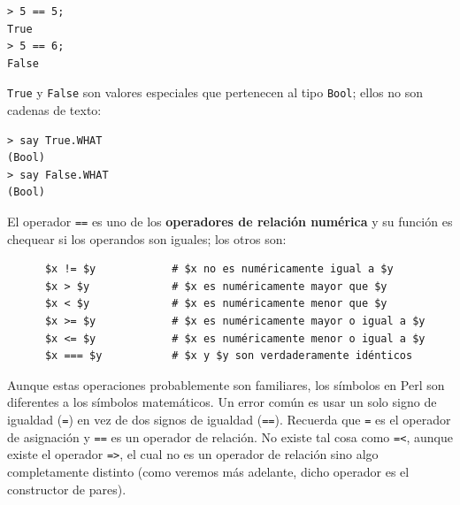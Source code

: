 \begin{verbatim}
> 5 == 5;
True
> 5 == 6;
False
\end{verbatim}
%
{\tt True} y {\tt False} son valores especiales
que pertenecen al tipo {\tt Bool}; ellos no son
cadenas de texto:

\begin{verbatim}
> say True.WHAT
(Bool)
> say False.WHAT
(Bool)
\end{verbatim}
%
El operador {\tt ==} es uno de los {\bf operadores de relación
numérica} y su función es chequear si los operandos son 
iguales; los otros son:

\begin{verbatim}
      $x != $y            # $x no es numéricamente igual a $y
      $x > $y             # $x es numéricamente mayor que $y
      $x < $y             # $x es numéricamente menor que $y
      $x >= $y            # $x es numéricamente mayor o igual a $y
      $x <= $y            # $x es numéricamente menor o igual a $y
      $x === $y           # $x y $y son verdaderamente idénticos
\end{verbatim}
\ifplastex \else
{}
\fi
Aunque estas operaciones probablemente son familiares, los
símbolos en Perl son diferentes a los símbolos matemáticos.
Un error común es usar un solo signo de igualdad ({\tt =}) en vez de 
dos signos de igualdad ({\tt ==}). Recuerda que {\tt =} es el
operador de asignación y {\tt ==} es un operador de relación.
No existe tal cosa como {\tt =<}, aunque existe el operador {\tt =>},
el cual no es un operador de relación sino algo completamente
distinto (como veremos más adelante, dicho operador es el constructor 
de pares). 
\ifplastex \else
{}
\fi

